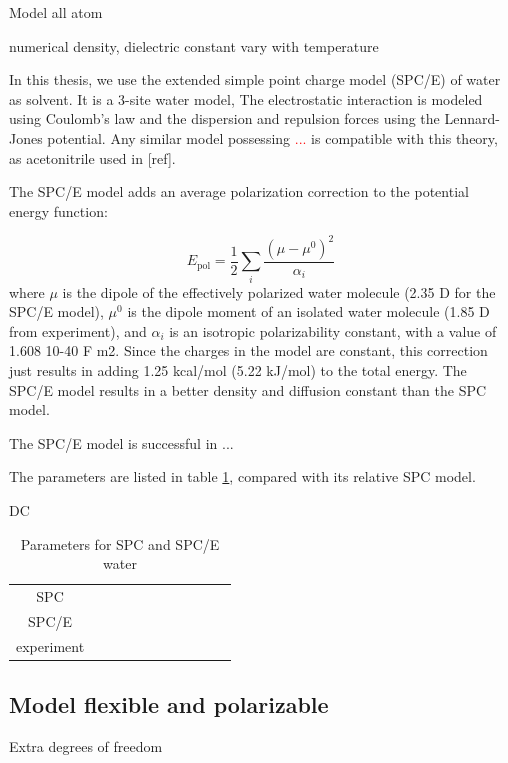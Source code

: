 Model all atom

numerical density, dielectric constant vary with temperature

In this thesis, we use the extended simple point charge model (SPC/E)
of water \citep{SPC/E} as solvent. It is a 3-site water model, The
electrostatic interaction is modeled using Coulomb's law and the dispersion
and repulsion forces using the Lennard-Jones potential. Any similar
model possessing \textcolor{red}{...} is compatible with this theory,
as acetonitrile used in {[}ref{]}.

The SPC/E model adds an average polarization correction to the potential
energy function:

\[
E_{\mathrm{pol}}=\frac{1}{2}\sum_{i}\dfrac{(\mu-\mu^{0})^{2}}{\alpha_{i}}
\]
where $\mu$ is the dipole of the effectively polarized water molecule
(2.35 D for the SPC/E model), $\mu^{0}$ is the dipole moment of an
isolated water molecule (1.85 D from experiment), and $\alpha_{i}$
is an isotropic polarizability constant, with a value of 1.608 \texttimes{}
10-40 F m2. Since the charges in the model are constant, this correction
just results in adding 1.25 kcal/mol (5.22 kJ/mol) to the total energy.
The SPC/E model results in a better density and diffusion constant
than the SPC model.

The SPC/E model is successful in ... 

The parameters are listed in table \ref{tab:SPC/E}, compared with
its relative SPC model.

DC \citep{Kusalik_1994_dc_spc/e}

\begin{table}
\begin{tabular}{|c|c|c|c|c|c|c|c|c|c|c|}
\hline 
 &  &  &  &  &  &  &  &  &  & \tabularnewline
\hline 
\hline 
SPC &  &  &  &  &  &  &  &  &  & \tabularnewline
\hline 
SPC/E &  &  &  &  &  &  &  &  &  & \tabularnewline
\hline 
experiment &  &  &  &  &  &  &  &  &  & \tabularnewline
\hline 
\end{tabular}

\caption{Parameters for SPC and SPC/E water\label{tab:SPC/E}}
\end{table}



\subsection{Model flexible and polarizable}

Extra degrees of freedom

